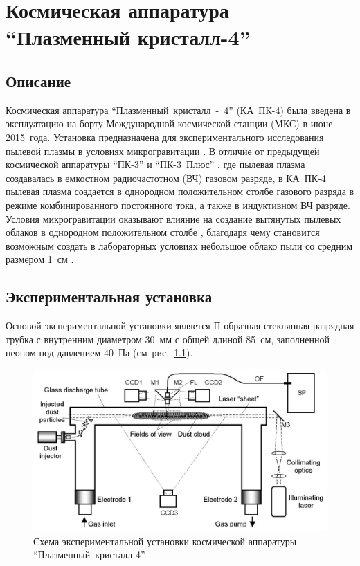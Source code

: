 \chapter{Космическая аппаратура “Плазменный кристалл-4”}
\label{cha:ch_3}
\section{Описание}
Космическая аппаратура “Плазменный~кристалл~-~4” (КА~ПК-4) была введена в эксплуатацию на борту
Международной космической станции (МКС) в июне 2015~года. Установка предназначена для экспериментального
исследования пылевой плазмы в условиях микрогравитации \cite{Pustylnik}. В отличие от предыдущей космической аппаратуры
“ПК-3” \cite{Nefedov} и “ПК-3~Плюс” \cite{Thomas}, где пылевая плазма создавалась в емкостном радиочастотном (ВЧ) газовом разряде,
в КА~ПК-4 пылевая плазма создается в однородном положительном столбе газового разряда в режиме
комбинированного постоянного тока, а также в индуктивном ВЧ разряде. Условия микрогравитации оказывают
влияние на создание вытянутых пылевых облаков в однородном положительном столбе \cite{Usachev},
благодаря чему становится возможным создать в лабораторных условиях небольшое облако пыли со средним размером 1~см \cite{Fortov}.

\section{Экспериментальная установка}
Основой экспериментальной установки является П-образная стеклянная разрядная трубка с внутренним диаметром 30~мм
с общей длиной 85~см, заполненной неоном под давлением 40~Па (см~рис.~\ref{fig:fig31}).

\begin{figure}
  \centering
  \includegraphics[width=12cm]{figures/fig31}
  \caption{Схема экспериментальной установки космической аппаратуры “Плазменный~кристалл-4”.}
  \label{fig:fig31}
\end{figure}

